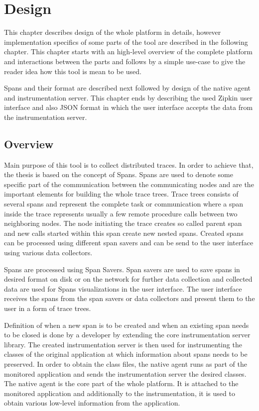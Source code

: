 \chapter{Design}
\label{chap:design}
This chapter describes design of the whole platform in details, however implementation specifics of some parts of the tool are described in the following chapter.  This chapter starts with an high-level overview of the complete platform and interactions between the parts and follows by a simple use-case to give the reader idea how this tool is mean to be used. 

Spans and their format are described next followed by design of the native agent and instrumentation server. This chapter ends by describing the used Zipkin user interface and also JSON format in which the user interface accepts the data from the instrumentation server. 

\section{Overview}
\label{design:overview}
Main purpose of this tool is to collect distributed traces. In order to achieve that, the thesis is based on the concept of Spans. Spans are used to denote some specific part of the communication between the communicating nodes and are the important elements for building the whole trace trees. Trace trees consists of several spans and represent the complete task or communication where a span inside the trace represents usually a few remote procedure calls between two neighboring nodes. The node initiating the trace creates so called parent span and new calls started within this span create new nested spans. Created spans can be processed using different span savers and can be send to the user interface using various data collectors. 

Spans are processed using Span Savers. Span savers are used to save spans in desired format on disk or on the network for further data collection and collected data are used for Spans visualizations in the user interface. The user interface receives the spans from the span savers or data collectors and present them to the user in a form of trace trees.

Definition of when a new span is to be created and when an existing span needs to be closed is done by a developer by extending the core instrumentation server library. The created instrumentation server is then used for instrumenting the classes of the original application at which information about spans needs to be preserved. In order to obtain the class files, the native agent runs  as part of the monitored application and sends the instrumentation server the desired classes. The native agent is the core part of the whole platform. It is attached to the monitored application and additionally to the instrumentation, it is used to obtain various low-level information from the application. 

